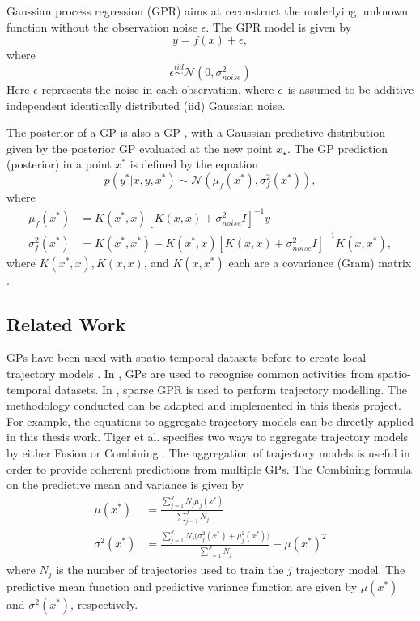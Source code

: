 Gaussian process regression (GPR) aims at reconstruct the underlying, unknown function without the observation noise $\epsilon$.
The GPR model is given by
\begin{equation}
    y = f(x) + \epsilon,
\end{equation}
where
\[\epsilon \overset{iid}{\sim} \mathcal{N}(0, \sigma_{noise}^2)\]
Here $\epsilon$ represents the noise in each observation, where $\epsilon$ is assumed to be additive independent identically distributed (iid) Gaussian noise.

The posterior of a GP is also a GP \cite{Rasmussen2006}, with a Gaussian predictive distribution given by the posterior GP evaluated at the new point $x_\star$.
The GP prediction (posterior) in a point $x^*$ is defined by the equation
\begin{equation}
    p(y^*|x, y, x^*) \sim \mathcal{N}(\mu_f(x^*), \sigma^2_f(x^*)),
\end{equation}
where
\begin{align}
    \mu_f(x^*) &= K(x^*, x)[K(x, x) + \sigma^2_{noise}I]^{-1}y \\
    \sigma^2_f(x^*) &= K(x^*, x^*) - K(x^*, x)[K(x, x) + \sigma^2_{noise}I]^{-1}K(x,x^*),
\end{align}
where $K(x^*, x), K(x, x)$, and $K(x, x^*)$ each are a covariance (Gram) matrix \cite{Rasmussen2006}.  

\subsection{Related Work} \label{sec:trajectory-aggregation}
GPs have been used with spatio-temporal datasets before to create local trajectory models \cite{Tiger2015-unsupervised-learning,Tiger2015-online-sparse, Tiger2018-gp-motion-pattern}.
In \cite{Tiger2015-unsupervised-learning}, GPs are used to recognise common activities from spatio-temporal datasets.
In \cite{Tiger2015-online-sparse}, sparse GPR is used to perform trajectory modelling.
The methodology conducted can be adapted and implemented in this thesis project.
For example, the equations to aggregate trajectory models can be directly applied in this thesis work.
Tiger et al. specifies two ways to aggregate trajectory models by either Fusion or Combining \cite{Tiger2015-online-sparse}.
The aggregation of trajectory models is useful in order to provide coherent predictions from multiple GPs.
The Combining formula on the predictive mean and variance is given by
\begin{align}
    \mu(x^*) &= \frac{\sum_{j=1}^J N_j \mu_j(x^*) }{\sum_{j=1}^J N_j} \label{eq:combining-mean} \\
    \sigma^2(x^*) &= \frac{\sum_{j=1}^J N_j \big(\sigma^2_j(x^*) + \mu^2_j(x^*)\big)}{\sum_{j=1}^J N_j} - \mu(x^*)^2 \label{eq:combining-var} 
\end{align}
where $N_j$ is the number of trajectories used to train the $j$ trajectory model.
The predictive mean function and predictive variance function are given by $\mu(x^*)$ and $\sigma^2(x^*)$, respectively.

